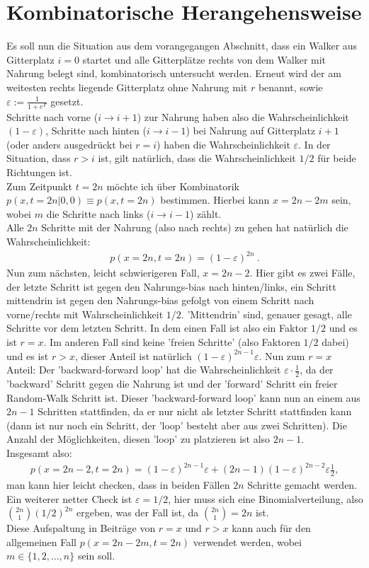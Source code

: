 \documentclass[a4paper, 12pt]{report}
\begin{document}
\section{Kombinatorische Herangehensweise}
Es soll nun die Situation aus dem vorangegangen Abschnitt, dass ein Walker aus Gitterplatz $i=0$ startet und alle Gitterplätze rechts von dem Walker mit Nahrung belegt sind, kombinatorisch untersucht werden. Erneut wird der am weitesten rechts liegende Gitterplatz ohne Nahrung mit $r$ benannt, sowie $\varepsilon:=\frac{1}{1+e^F}$ gesetzt.
\\
Schritte nach vorne ($i \rightarrow i+1$) zur Nahrung haben also die Wahrscheinlichkeit $(1-\varepsilon)$, Schritte nach hinten ($i \rightarrow i-1$) bei Nahrung auf Gitterplatz $i+1$ (oder anders ausgedrückt bei $r=i$) haben die Wahrscheinlichkeit $\varepsilon$. In der Situation, dass $r>i$ ist, gilt natürlich, dass die Wahrscheinlichkeit $1/2$ für beide Richtungen ist.
\\
Zum Zeitpunkt $t=2n$ möchte ich über Kombinatorik $p(x,t=2n|0,0)\equiv p(x,t=2n)$ bestimmen. Hierbei kann $x=2n-2m$ sein, wobei $m$ die Schritte nach links ($i \rightarrow i-1$) zählt.
\\
Alle $2n$ Schritte mit der Nahrung (also nach rechts) zu gehen hat natürlich die Wahrscheinlichkeit:
\begin{align}
p(x=2n,t=2n) = (1-\varepsilon)^{2n}\ .
\end{align}
Nun zum nächsten, leicht schwierigeren Fall, $x=2n-2$. Hier gibt es zwei Fälle, der letzte Schritt ist gegen den Nahrungs-bias nach hinten/links, ein Schritt mittendrin ist gegen den Nahrungs-bias gefolgt von einem Schritt nach vorne/rechts mit Wahrscheinlichkeit $1/2$. 'Mittendrin' sind, genauer gesagt, alle Schritte vor dem letzten Schritt. In dem einen Fall ist also ein Faktor $1/2$ und es ist $r=x$. Im anderen Fall sind keine 'freien Schritte' (also Faktoren $1/2$ dabei) und es ist $r>x$, dieser Anteil ist natürlich $(1-\varepsilon)^{2n-1}\varepsilon$. Nun zum $r=x$ Anteil: Der 'backward-forward loop' hat die Wahrscheinlichkeit $\varepsilon \cdot \frac{1}{2}$, da der 'backward' Schritt gegen die Nahrung ist und der 'forward' Schritt ein freier Random-Walk Schritt ist. Dieser 'backward-forward loop' kann nun an einem aus $2n-1$ Schritten stattfinden, da er nur nicht als letzter Schritt stattfinden kann (dann ist nur noch ein Schritt, der 'loop' besteht aber aus zwei Schritten). Die Anzahl der Möglichkeiten, diesen 'loop' zu platzieren ist also $2n-1$.
\\
Insgesamt also:
\begin{align}
p(x=2n-2,t=2n)=(1-\varepsilon)^{2n-1}\varepsilon+(2n-1)(1-\varepsilon)^{2n-2}\varepsilon\frac{1}{2},
\end{align}
man kann hier leicht checken, dass in beiden Fällen $2n$ Schritte gemacht werden.
\\
Ein weiterer netter Check ist $\varepsilon = 1/2$, hier muss sich eine Binomialverteilung, also ${2n \choose 1} (1/2)^{2n}$ ergeben, was der Fall ist, da ${2n \choose 1}=2n$ ist.
\\
Diese Aufspaltung in Beiträge von $r=x$ und $r>x$ kann auch für den allgemeinen Fall $p(x=2n-2m,t=2n)$ verwendet werden, wobei $m \in \{1,2,...,n\}$ sein soll.
\end{document}
